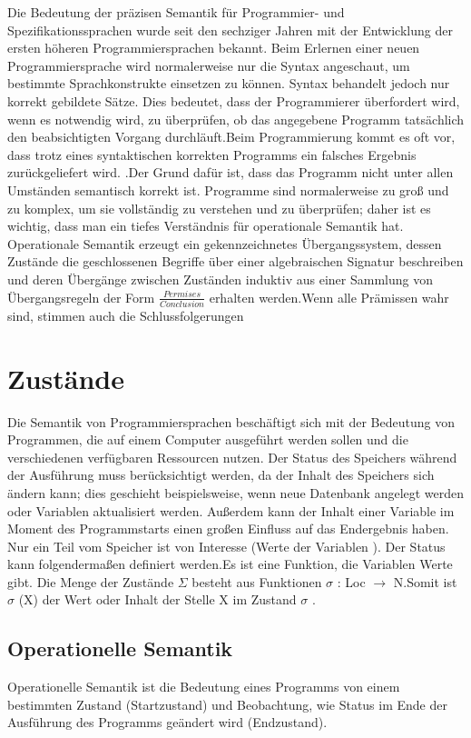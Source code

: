 \documentclass[a4paper,12pt,twoside,headsepline]{scrartcl}
\begin{document}
Die Bedeutung der präzisen Semantik für Programmier- und Spezifikationssprachen wurde seit den sechziger Jahren mit der Entwicklung der ersten höheren Programmiersprachen bekannt. 
Beim Erlernen einer neuen Programmiersprache wird normalerweise nur die Syntax angeschaut, um bestimmte Sprachkonstrukte einsetzen zu können. Syntax behandelt jedoch nur korrekt gebildete Sätze. 
Dies bedeutet, dass der Programmierer überfordert wird, wenn es notwendig wird, zu überprüfen, ob das angegebene Programm tatsächlich den beabsichtigten Vorgang durchläuft.Beim Programmierung kommt es oft vor, dass trotz eines syntaktischen korrekten Programms ein falsches Ergebnis zurückgeliefert wird.  .Der Grund dafür ist, dass das Programm nicht unter allen Umständen semantisch korrekt ist. Programme sind normalerweise zu groß und zu komplex, um sie vollständig zu verstehen und zu überprüfen; daher ist es wichtig, dass man ein tiefes Verständnis für operationale Semantik hat.
 Operationale Semantik erzeugt ein gekennzeichnetes Übergangssystem, dessen Zustände die geschlossenen Begriffe über einer algebraischen Signatur beschreiben und deren Übergänge zwischen Zuständen induktiv aus einer Sammlung von Übergangsregeln der Form $\frac{ Permises} {Conclusion}$ erhalten werden.Wenn alle Prämissen wahr sind, stimmen auch die Schlussfolgerungen

\section{Zustände}
Die Semantik von Programmiersprachen beschäftigt sich mit der Bedeutung von Programmen, die auf einem Computer ausgeführt werden sollen und die verschiedenen verfügbaren Ressourcen nutzen.
 Der Status des Speichers während der Ausführung muss berücksichtigt werden, da der Inhalt des Speichers sich ändern kann; dies geschieht beispielsweise, wenn neue Datenbank angelegt werden oder Variablen aktualisiert werden.
Außerdem kann der Inhalt einer Variable im Moment des Programmstarts  einen großen Einfluss auf das Endergebnis haben.
Nur ein Teil vom Speicher ist von Interesse (Werte der Variablen ).
Der Status kann folgendermaßen definiert werden.Es ist eine Funktion, die Variablen Werte  gibt.
 Die Menge der Zustände $\Sigma$ besteht aus Funktionen $\sigma$ : Loc $\rightarrow$ N.Somit ist $\sigma$ (X) der Wert oder Inhalt der Stelle X im Zustand $\sigma$ .
 
 \subsection{Operationelle Semantik}
Operationelle Semantik ist die Bedeutung eines Programms von einem bestimmten Zustand (Startzustand) und Beobachtung, wie Status im Ende der Ausführung des Programms geändert wird (Endzustand).
\end{document}
